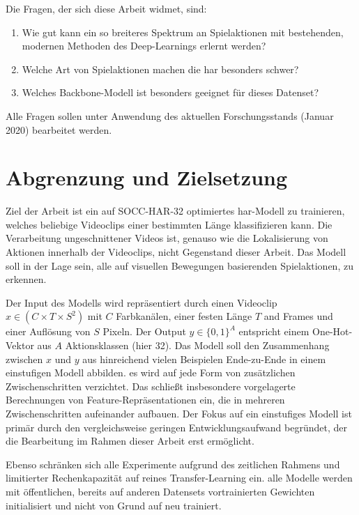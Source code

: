 Die Fragen, der sich diese Arbeit widmet, sind:
\begin{enumerate}
    \item Wie gut kann ein so breiteres Spektrum an Spielaktionen mit bestehenden, modernen Methoden des Deep-Learnings erlernt werden?
    \item Welche Art von Spielaktionen machen die \gls{har} besonders schwer?
    \item Welches Backbone-Modell ist besonders geeignet für dieses Datenset?
\end{enumerate}

Alle Fragen sollen unter Anwendung des aktuellen Forschungsstands (Januar 2020) bearbeitet werden.

\section{Abgrenzung und Zielsetzung}
\label{sec:zielsetzung}

Ziel der Arbeit ist ein auf SOCC-HAR-32 optimiertes \gls{har}-Modell zu trainieren, welches beliebige Videoclips einer bestimmten Länge klassifizieren kann.
Die Verarbeitung ungeschnittener Videos ist, genauso wie die Lokalisierung von Aktionen innerhalb der Videoclips, nicht Gegenstand dieser Arbeit.
Das Modell soll in der Lage sein, alle auf visuellen Bewegungen basierenden Spielaktionen, zu erkennen.

Der Input des Modells wird repräsentiert durch einen Videoclip $x \in (C \times T \times S^2)$ mit $C$ Farbkanälen, einer festen Länge $T$ and Frames und einer Auflösung von $S$ Pixeln.
Der Output $y \in \{0, 1\}^A$ entspricht einem One-Hot-Vektor aus $A$ Aktionsklassen (hier 32).
Das Modell soll den Zusammenhang zwischen $x$ und $y$ aus hinreichend vielen Beispielen Ende-zu-Ende in einem einstufigen Modell abbilden.
\Dh es wird auf jede Form von zusätzlichen Zwischenschritten verzichtet.
Das schließt insbesondere vorgelagerte Berechnungen von Feature-Repräsentationen ein, die in mehreren Zwischenschritten aufeinander aufbauen.
Der Fokus auf ein einstufiges Modell ist primär durch den vergleichsweise geringen Entwicklungsaufwand begründet, der die Bearbeitung im Rahmen dieser Arbeit erst ermöglicht.

Ebenso schränken sich alle Experimente aufgrund des zeitlichen Rahmens und limitierter Rechenkapazität auf reines Transfer-Learning ein.
\Dh alle Modelle werden mit öffentlichen, bereits auf anderen Datensets vortrainierten Gewichten initialisiert und nicht von Grund auf neu trainiert.

